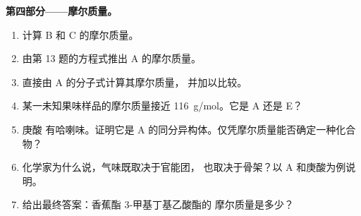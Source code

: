 \begin{problem}
\medskip
\noindent\textbf{第四部分——摩尔质量。}
\begin{enumerate}[resume]
  \item 计算 B 和 C 的摩尔质量。
  \item 由第 13 题的方程式推出 A 的摩尔质量。
  \item 直接由 A 的分子式计算其摩尔质量，
        并加以比较。
  \item 某一未知果味样品的摩尔质量接近
        \qty{116}{g/mol}。它是 A 还是 E？
  \item 庚酸  有哈喇味。证明它是
        A 的同分异构体。仅凭摩尔质量能否确定一种化合物？
  \item 化学家为什么说，气味既取决于官能团，
        也取决于骨架？以 A 和庚酸为例说明。
  \item 给出最终答案：香蕉酯 3-甲基丁基乙酸酯的
        摩尔质量是多少？
\end{enumerate}
\end{problem}
